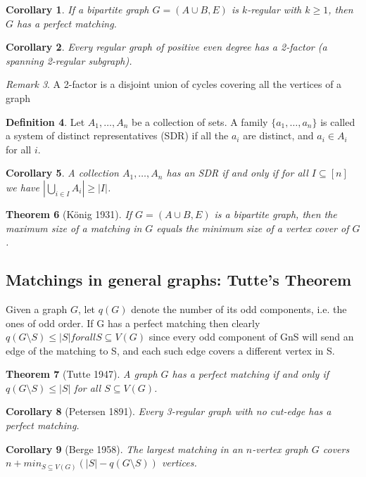 \documentclass[10pt, fleqn, a4paper, landscape]{article}
\theoremstyle{plain} %
\newtheorem{thm}{Theorem}
\newtheorem{cor}[thm]{Corollary}
\theoremstyle{remark} %
\newtheorem{rem}[thm]{Remark}
\theoremstyle{definition} %
\newtheorem{defi}[thm]{Definition}
\begin{document}
\begin{multicols}{3}
\begin{tiny}
\begin{cor}
If a bipartite graph $G = (A \cup B,E) $ is $k$-regular with $k \ge 1$, then $G$ has a perfect matching.
\end{cor}

\begin{cor}
Every regular graph of positive even degree has a 2-factor (a spanning 2-regular subgraph).
\end{cor}

\begin{rem}
A 2-factor is a disjoint union of cycles covering all the vertices of a graph
\end{rem}

\begin{defi}
Let $A_1, \dots ,A_n$ be a collection of sets. A family $\{a_1, \dots , a_n\}$  is called a system of distinct representatives (SDR) if all the $a_i$ are distinct, and $a_i \in A_i$ for all $i$.
\end{defi}

\begin{cor}
A collection $A_1, \dots ,A_n$ has an SDR if and only if for all $I \subseteq [n]$ we have $|\bigcup_{i\in I} A_i|\ge|I|$.
\end{cor}
\addtocounter{thm}{1}
\begin{thm}[König 1931]
If $G = (A \cup B,E)$ is a bipartite graph, then the maximum size of a
matching in $G$ equals the minimum size of a vertex cover of $G$.
\end{thm}

\subsection{Matchings in general graphs: Tutte’s Theorem}
Given a graph $G$, let $q(G)$ denote the number of its odd components, i.e. the ones of odd order. If G has a perfect matching then clearly
$q(G\setminus S) \le|S|for all S \subseteq V (G)$
since every odd component of GnS will send an edge of the matching to S, and each such edge covers a different vertex in S.

\begin{thm}[Tutte 1947]
A graph $G$ has a perfect matching if and only if $q(G\setminus S) \le|S|$ for
all $S \subseteq V (G)$.
\end{thm}

\begin{cor}[Petersen 1891]
Every 3-regular graph with no cut-edge has a perfect matching.
\end{cor}
\addtocounter{thm}{1}
\begin{cor}[Berge 1958]
The largest matching in an $n$-vertex graph $G$ covers $n+min_{S\subseteq V (G)}(|S|- q(G\setminus S))$ vertices.
\end{cor}


\end{tiny}
\end{multicols}
\end{document}
